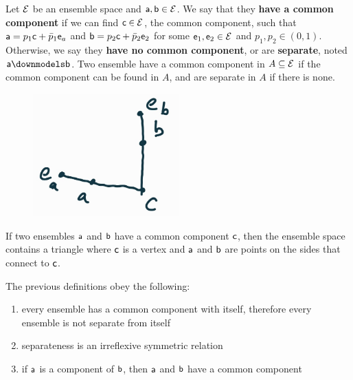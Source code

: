 \begin{defn}
	Let $\Ens$ be an ensemble space and $\ens[a], \ens[b] \in \Ens$. We say that they \textbf{have a common component} if we can find $\ens[c] \in \Ens$, the common component, such that $\ens[a] = p_1 \ens[c] + \bar{p}_1 \ens_a$ and $\ens[b] = p_2 \ens[c] + \bar{p}_2 \ens_2$ for some $\ens_1, \ens_2 \in \Ens$ and $p_1, p_2 \in (0,1)$. Otherwise, we say they \textbf{have no common component}, or are \textbf{separate}, noted $\ens[a] \separate \ens[b]$. Two ensemble have a common component in $A \subseteq \Ens$ if the common component can be found in $A$, and are separate in $A$ if there is none.
\end{defn}

\begin{figure}[h]
	\centering
	\includegraphics[width=0.5\textwidth]{tempimages/CommonComponent.jpg}
\end{figure}

\begin{remark}
	If two ensembles $\ens[a]$ and $\ens[b]$ have a common component $\ens[c]$, then the ensemble space contains a triangle where $\ens[c]$ is a vertex and $\ens[a]$ and $\ens[b]$ are points on the sides that connect to $\ens[c]$.
\end{remark}

\begin{coro}
	The previous definitions obey the following:
	\begin{enumerate}
		\item every ensemble has a common component with itself, therefore every ensemble is not separate from itself
		\item separateness is an irreflexive symmetric relation
		\item if $\ens[a]$ is a component of $\ens[b]$, then $\ens[a]$ and $\ens[b]$ have a common component
	\end{enumerate}
\end{coro}

